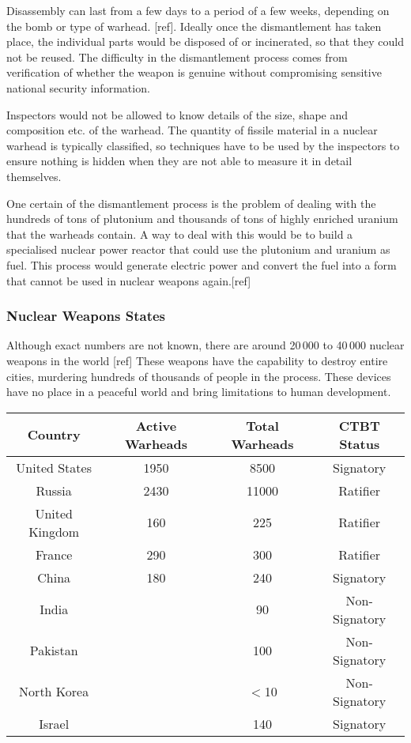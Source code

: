 \documentclass[a4paper]{article}
\begin{document}
Disassembly can last from a few days to a period of a few weeks, depending on 
the bomb or type of warhead. [ref]. Ideally once the dismantlement has taken 
place, the individual parts would be disposed of or incinerated, so that they 
could not be reused. The difficulty in the dismantlement process comes from 
verification of whether the weapon is genuine without compromising sensitive 
national security information.

Inspectors would not be allowed to know details of the size, shape and 
composition etc. of the warhead. The quantity of fissile material in a nuclear 
warhead is typically classified, so techniques have to be used by the inspectors 
to ensure nothing is hidden when they are not able to measure it in detail 
themselves.

One certain of the dismantlement process is the problem of dealing with the 
hundreds of tons of plutonium and thousands of tons of highly enriched uranium 
that the warheads contain. A way to deal with this would be to build a 
specialised nuclear power reactor that could use the plutonium and uranium as 
fuel. This process would generate electric power and convert the fuel into a 
form that cannot be used in nuclear weapons again.[ref]

\subsubsection{Nuclear Weapons States}
Although exact numbers are not known, there are around 20\,000 to 40\,000 
nuclear weapons in the world [ref] These weapons have the capability to destroy 
entire cities, murdering hundreds of thousands of people in the process. These 
devices have no place in a peaceful world and bring limitations to human development. 

\begin{tabular}{|c|c|c|c|}
  \hline
  Country & Active Warheads & Total Warheads 	& CTBT Status 	\\
  \hline
  United States 	& 1950 	& 8500 		& Signatory 	\\
  Russia 		& 2430 	& 11000 	& Ratifier 	\\
  United Kingdom 	& 160 	& 225 		& Ratifier 	\\
  France		& 290	& 300		& Ratifier	\\
  China			& 180	& 240		& Signatory	\\
  India			&	& 90		& Non-Signatory	\\
  Pakistan		&	& 100		& Non-Signatory \\
  North Korea		&	& \(<\)10 	& Non-Signatory \\
  Israel		&	& 140		& Signatory	\\
  \hline
\end{tabular}
\end{document}
